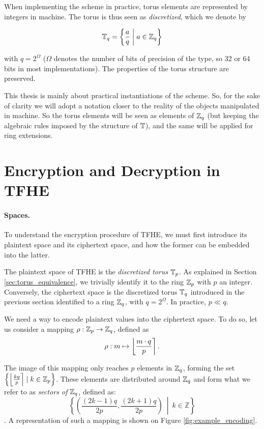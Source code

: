 When implementing the scheme in practice, torus elements are represented by integers in machine. The torus is thus seen as \textit{discretized}, which we denote by 

\[ \mathbb{T}_q = \left \{   \frac a q \;\middle|\; a \in \mathbb{Z}_q  \right \} \] 

with $q = 2^\Omega$ ($\Omega$ denotes the number of bits of precision of the type, so 32 or 64 bits in most implementations). The properties of the torus structure are preserved.


This thesis is mainly about practical instantiations of the scheme. So, for the sake of clarity we will adopt a notation closer to the reality of the objects manipulated in machine. So the torus elements will be seen as elements of $\mathbb{Z}_q$ (but keeping the algebraic rules imposed by the structure of $\mathbb{T}$), and the same will be applied for ring extensions. 



\section{Encryption and Decryption in TFHE}
\label{sec:encryption}

\paragraph{Spaces.}

To understand the encryption procedure of TFHE, we must first introduce its plaintext space and its ciphertext space, and how the former can be embedded into the latter.

The plaintext space of TFHE is the \textit{discretized torus} $\mathbb{T}_p$. As explained in Section \ref{sec:torus_equivalence}, we trivially identify it to the ring $\mathbb{Z}_p$ with $p$ an integer. Conversely, the ciphertext space is the discretized torus $\mathbb{T}_q$ introduced in the previous section identified to a ring $\mathbb{Z}_q$, with $q = 2^\Omega$. In practice, $p \ll q$.


We need a way to encode plaintext values into the ciphertext space. To do so, let us consider a mapping $\rho: \mathbb{Z}_p \rightarrow \mathbb{Z}_q$, defined as \[
\rho: m  \mapsto \left \lfloor \frac{m \cdot q} {p} \right \rceil.
\]


The image of this mapping only reaches $p$ elements in $\mathbb{Z}_q$, forming the set $\left \{ \left \lfloor \frac {k q}{p} \right \rceil \mid k \in \mathbb{Z}_p \right \}$. These elements are distributed around $\mathbb{Z}_q$ and form what we refer to as \emph{sectors of $\mathbb{Z}_q$}, defined as: \[
\left\{ \left( \frac{(2k - 1)q}{2p}, \frac{(2k + 1)q}{2p} \right) ~\middle|~ k \in \mathbb{Z} \right\}
\]. A representation of such a mapping is shown on Figure \ref{fig:example_encoding}.

